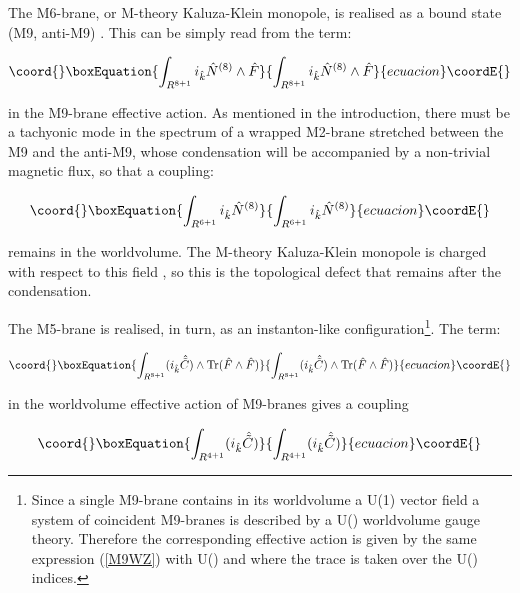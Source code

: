 \documentclass[12pt,a4paper]{article}
\begin{document}
The M6-brane, or M-theory Kaluza-Klein monopole, is realised as a 
bound state (M9, anti-M9) \cite{HL1}. 
This can be simply read from the term:

\begin{equation}\coord{}\boxEquation{
\int_{R^{8+1}} i_{\hat k}{\hat N}^{(8)}\wedge {\hat F}
}{
\int_{R^{8+1}} i_{\hat k}{\hat N}^{(8)}\wedge {\hat F}
}{ecuacion}\coordE{}\end{equation}

\noindent in the M9-brane effective action. As mentioned in the
introduction, there must be a tachyonic mode in the spectrum of a 
wrapped M2-brane stretched between the M9 and the anti-M9,
whose condensation will be accompanied by a 
non-trivial magnetic flux, so that a coupling:

\begin{equation}\coord{}\boxEquation{
\int_{R^{6+1}} i_{\hat k}{\hat N}^{(8)}
}{
\int_{R^{6+1}} i_{\hat k}{\hat N}^{(8)}
}{ecuacion}\coordE{}\end{equation}

\noindent remains in the worldvolume. 
The M-theory Kaluza-Klein monopole is charged with
respect to this field \cite{BEL}, 
so this is the topological defect that remains
after the condensation.

The M5-brane is realised, in turn, as an instanton-like 
configuration\footnote{Since a single M9-brane contains in
its worldvolume a U(1) vector field a system of \coordHE{} coincident
M9-branes is described by a U(\coordHE{}) worldvolume gauge theory.
Therefore the corresponding effective action is given by the 
same expression (\ref{M9WZ}) with \coordHE{} U(\coordHE{}) and where the trace is
taken over the U(\coordHE{}) indices.}.
The term:

\begin{equation}\coord{}\boxEquation{
\int_{R^{8+1}}(i_{\hat k}{\hat {\tilde C}})\wedge {\rm Tr}({\hat F}\wedge
{\hat F})
}{
\int_{R^{8+1}}(i_{\hat k}{\hat {\tilde C}})\wedge {\rm Tr}({\hat F}\wedge
{\hat F})
}{ecuacion}\coordE{}\end{equation}

\noindent in the worldvolume effective action of \coordHE{} M9-branes
gives a coupling

\begin{equation}\coord{}\boxEquation{
\int_{R^{4+1}}(i_{\hat k}{\hat {\tilde C}})
}{
\int_{R^{4+1}}(i_{\hat k}{\hat {\tilde C}})
}{ecuacion}\coordE{}\end{equation}
\end{document}
